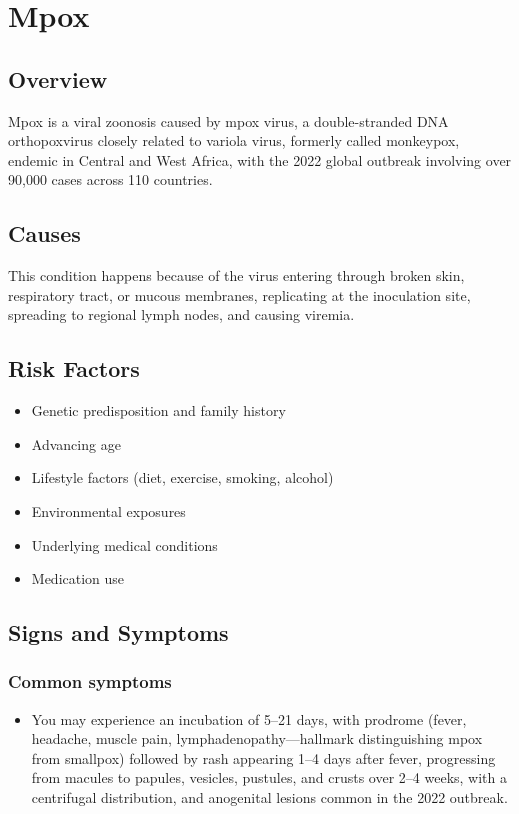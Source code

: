 \chapter{Mpox}
\label{sec:Mpox}

\section{Overview}
Mpox is a viral zoonosis caused by mpox virus, a double-stranded DNA orthopoxvirus closely related to variola virus, formerly called monkeypox, endemic in Central and West Africa, with the 2022 global outbreak involving over 90,000 cases across 110 countries.
\section{Causes}
This condition happens because of the virus entering through broken skin, respiratory tract, or mucous membranes, replicating at the inoculation site, spreading to regional lymph nodes, and causing viremia.     
\section{Risk Factors}

\begin{itemize}[noitemsep]
  \item Genetic predisposition and family history
  \item Advancing age
  \item Lifestyle factors (diet, exercise, smoking, alcohol)
  \item Environmental exposures
  \item Underlying medical conditions
  \item Medication use
\end{itemize}
\section{Signs and Symptoms}

\subsection{Common symptoms}
\begin{itemize}[noitemsep]
  \item You may experience an incubation of 5--21 days, with prodrome (fever, headache, muscle pain, lymphadenopathy---hallmark distinguishing mpox from smallpox) followed by rash appearing 1--4 days after fever, progressing from macules to papules, vesicles, pustules, and crusts over 2--4 weeks, with a centrifugal distribution, and anogenital lesions common in the 2022 outbreak. 
  \end{itemize}

